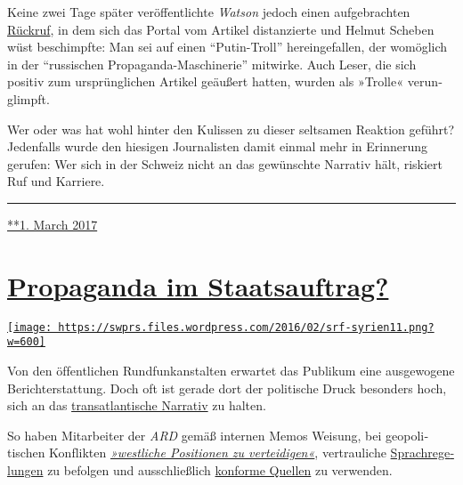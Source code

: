 Keine zwei Tage später veröffentlichte \emph{Watson} jedoch einen
aufgebrachten \href{https://www.watson.ch/!491379853}{Rückruf}, in dem
sich das Portal vom Artikel distanzierte und Helmut Scheben wüst
beschimpfte: Man sei auf einen ``Putin-Troll'' herein­ge­fallen, der
wo­möglich in der ``russischen Propaganda-Maschinerie'' mit­wirke. Auch
Leser, die sich positiv zum ur­sprüng­lichen Artikel geäußert hatten,
wurden als »Trolle« verun­glimpft.

Wer oder was hat wohl hinter den Kulissen zu dieser selt­samen Reak­tion
geführt? Jeden­falls wurde den hiesigen Journa­listen damit einmal mehr
in Er­in­nerung gerufen: Wer sich in der Schweiz nicht an das
ge­wünschte Nar­ra­tiv hält, ris­kiert Ruf und Karriere.

\begin{center}\rule{0.5\linewidth}{\linethickness}\end{center}

\href{https://swprs.org/2017/03/01/das-gewuenschte-narrativ-ii/}{**1.
March 2017}

\hypertarget{propaganda-im-staatsauftrag}{%
\section{\texorpdfstring{\href{https://swprs.org/2017/03/01/propaganda-im-staatsauftrag/}{Propaganda
im
Staatsauftrag?}}{Propaganda im Staatsauftrag?}}\label{propaganda-im-staatsauftrag}}

\href{https://swprs.org/2017/03/01/propaganda-im-staatsauftrag/}{\texttt{[image: https://swprs.files.wordpress.com/2016/02/srf-syrien11.png?w=600]}}

Von den öf‌fentlichen Rund­funk­an­stalten er­war­tet das Pu­bli­kum
eine aus­ge­wogene Bericht­er­stattung. Doch of‌t ist ge­rade dort der
politische Druck be­sonders hoch, sich an das
\href{https://swprs.org/das-gewuenschte-narrativ/}{trans­at­lan­tische
Narra­tiv} zu halten.

So haben Mitarbeiter der \emph{ARD} gemäß internen Memos Weisung, bei
geo­po­li­tischen Kon­f‌lik­ten
\emph{\href{https://www.heise.de/tp/features/Ukraine-Konflikt-ARD-Programmbeirat-bestaetigt-Publikumskritik-3367400.html}{»west­liche
Posi­tionen zu ver­tei­di­gen«}}, ver­trau­liche
\href{https://www.heise.de/tp/features/Die-vertraulichen-Sprachregelungen-der-ARD-3758887.html}{Sprach­­re­­ge­lungen}
zu be­fol­gen und aus­­schließ­­lich
\href{https://www.oxmoxhh.de/magazin/story-interview/oxmox-exklusiv-interview-mit-volker-braeutigam-friedhelm-klinkhammer/}{konforme
Quellen} zu ver­wen­den.

